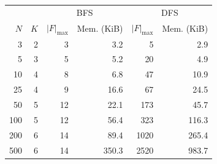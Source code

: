 \begin{tabular}{@{}rr|rr|rr@{}}
\toprule
 & & \multicolumn{2}{c|}{BFS} & \multicolumn{2}{c}{DFS} \\
$N$ & $K$ & $|F|_{\max}$ & Mem. (KiB) & $|F|_{\max}$ & Mem. (KiB) \\
\midrule
3 & 2 & 3 & 3.2 & 5 & 2.9 \\
5 & 3 & 5 & 5.2 & 20 & 4.9 \\
10 & 4 & 8 & 6.8 & 47 & 10.9 \\
25 & 4 & 9 & 16.6 & 67 & 24.5 \\
50 & 5 & 12 & 22.1 & 173 & 45.7 \\
100 & 5 & 12 & 56.4 & 323 & 116.3 \\
200 & 6 & 14 & 89.4 & 1020 & 265.4 \\
500 & 6 & 14 & 350.3 & 2520 & 983.7 \\
\bottomrule
\end{tabular}
